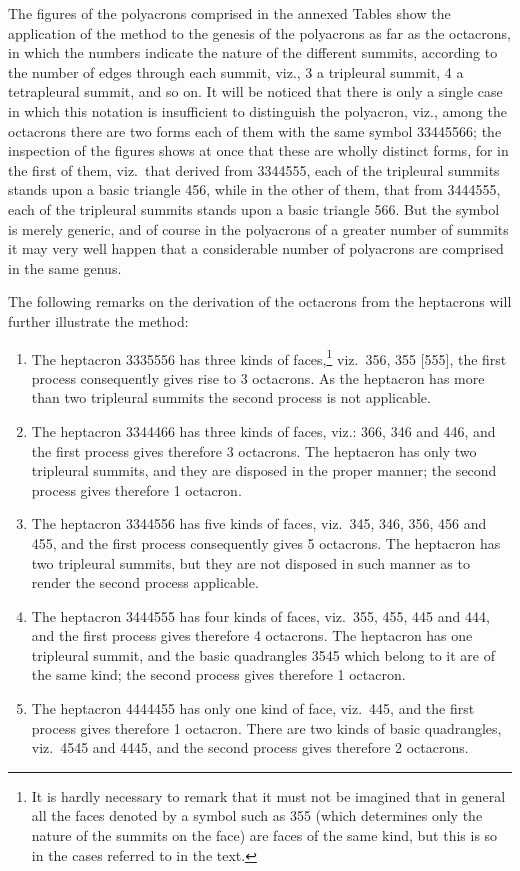 \documentclass[11pt,a4paper]{article}
\begin{document}
The figures of the polyacrons comprised in the annexed Tables show the application of the method to the genesis of the polyacrons as far as the octacrons, in which the numbers indicate the nature of the different summits, according to the number of edges through each summit, viz., 3 a tripleural summit, 4 a tetrapleural summit, and so on. It will be noticed that there is only a single case in which this notation is insufficient to distinguish the polyacron, viz., among the octacrons there are two forms each of them with the same symbol 33445566; the inspection of the figures shows at once that these are wholly distinct forms, for in the first of them, viz.\ that derived from 3344555, each of the tripleural summits stands upon a basic triangle 456, while in the other of them, that from 3444555, each of the tripleural summits stands upon a basic triangle 566. But the symbol is merely generic, and of course in the polyacrons of a greater number of summits it may very well happen that a considerable number of polyacrons are comprised in the same genus.

The following remarks on the derivation of the octacrons from the heptacrons will further illustrate the method:

\begin{enumerate}[label=\arabic*.,leftmargin=2em]
\item The heptacron 3335556 has three kinds of faces,\footnote{It is hardly necessary to remark that it must not be imagined that in general all the faces denoted by a symbol such as 355 (which determines only the nature of the summits on the face) are faces of the same kind, but this is so in the cases referred to in the text.} viz.\ 356, 355 [555], the first process consequently gives rise to 3 octacrons. As the heptacron has more than two tripleural summits the second process is not applicable.
\item The heptacron 3344466 has three kinds of faces, viz.: 366, 346 and 446, and the first process gives therefore 3 octacrons. The heptacron has only two tripleural summits, and they are disposed in the proper manner; the second process gives therefore 1 octacron.
\item The heptacron 3344556 has five kinds of faces, viz.\ 345, 346, 356, 456 and 455, and the first process consequently gives 5 octacrons. The heptacron has two tripleural summits, but they are not disposed in such manner as to render the second process applicable.
\item The heptacron 3444555 has four kinds of faces, viz.\ 355, 455, 445 and 444, and the first process gives therefore 4 octacrons. The heptacron has one tripleural summit, and the basic quadrangles 3545 which belong to it are of the same kind; the second process gives therefore 1 octacron.
\item The heptacron 4444455 has only one kind of face, viz.\ 445, and the first process gives therefore 1 octacron. There are two kinds of basic quadrangles, viz.\ 4545 and 4445, and the second process gives therefore 2 octacrons.
\end{enumerate}
\end{document}
